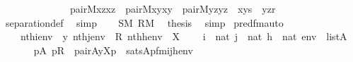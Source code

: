 \begin{isabellebody}
\ \ \ \ \ \ \ \ \ \ \ \ \ \ pair{\isacharparenleft}{\kern0pt}{\isacharhash}{\kern0pt}{\isacharhash}{\kern0pt}M{\isacharcomma}{\kern0pt}x{\isacharcomma}{\kern0pt}z{\isacharcomma}{\kern0pt}xz{\isacharparenright}{\kern0pt}\ {\isacharampersand}{\kern0pt}\ pair{\isacharparenleft}{\kern0pt}{\isacharhash}{\kern0pt}{\isacharhash}{\kern0pt}M{\isacharcomma}{\kern0pt}x{\isacharcomma}{\kern0pt}y{\isacharcomma}{\kern0pt}xy{\isacharparenright}{\kern0pt}\ {\isacharampersand}{\kern0pt}\ pair{\isacharparenleft}{\kern0pt}{\isacharhash}{\kern0pt}{\isacharhash}{\kern0pt}M{\isacharcomma}{\kern0pt}y{\isacharcomma}{\kern0pt}z{\isacharcomma}{\kern0pt}yz{\isacharparenright}{\kern0pt}\ {\isacharampersand}{\kern0pt}\ xy{\isasymin}s\ {\isacharampersand}{\kern0pt}\ yz{\isasymin}r{\isacharparenright}{\kern0pt}{\isachardoublequoteclose}\isanewline
\ \ \ \ \isamarkupfalse%
\ separation{\isacharunderscore}{\kern0pt}def\ \isamarkupfalse%
\ simp\isanewline
\ \ \isamarkupfalse%
\ {\isacartoucheopen}S{\isasymin}M{\isacartoucheclose}\ {\isacartoucheopen}R{\isasymin}M{\isacartoucheclose}\ \isamarkupfalse%
\ {\isacharquery}{\kern0pt}thesis\ \isamarkupfalse%
\ simp\isanewline
{}\isamarkupfalse%
%
\endisatagproof
{\isafoldproof}%
%
\isadelimproof
\isanewline
%
\endisadelimproof
\isanewline
\isanewline
{}\isamarkupfalse%
\ pred{\isacharunderscore}{\kern0pt}fm{\isacharunderscore}{\kern0pt}auto{\isacharcolon}{\kern0pt}\isanewline
\ \ \isanewline
\ \ \ \ {\isachardoublequoteopen}nth{\isacharparenleft}{\kern0pt}i{\isacharcomma}{\kern0pt}env{\isacharparenright}{\kern0pt}\ {\isacharequal}{\kern0pt}\ y{\isachardoublequoteclose}\ {\isachardoublequoteopen}nth{\isacharparenleft}{\kern0pt}j{\isacharcomma}{\kern0pt}env{\isacharparenright}{\kern0pt}\ {\isacharequal}{\kern0pt}\ R{\isachardoublequoteclose}\ {\isachardoublequoteopen}nth{\isacharparenleft}{\kern0pt}h{\isacharcomma}{\kern0pt}env{\isacharparenright}{\kern0pt}\ {\isacharequal}{\kern0pt}\ X{\isachardoublequoteclose}\isanewline
\ \ \ \ {\isachardoublequoteopen}i\ {\isasymin}\ nat{\isachardoublequoteclose}\ {\isachardoublequoteopen}j\ {\isasymin}\ nat{\isachardoublequoteclose}\ {\isachardoublequoteopen}h\ {\isasymin}\ nat{\isachardoublequoteclose}\ {\isachardoublequoteopen}env\ {\isasymin}\ list{\isacharparenleft}{\kern0pt}A{\isacharparenright}{\kern0pt}{\isachardoublequoteclose}\isanewline
\ \ \isanewline
\ \ \ \ {\isachardoublequoteopen}{\isacharparenleft}{\kern0pt}{\isasymexists}p{\isasymin}A{\isachardot}{\kern0pt}\ p{\isasymin}R\ {\isacharampersand}{\kern0pt}\ pair{\isacharparenleft}{\kern0pt}{\isacharhash}{\kern0pt}{\isacharhash}{\kern0pt}A{\isacharcomma}{\kern0pt}y{\isacharcomma}{\kern0pt}X{\isacharcomma}{\kern0pt}p{\isacharparenright}{\kern0pt}{\isacharparenright}{\kern0pt}\ {\isasymlongleftrightarrow}\ sats{\isacharparenleft}{\kern0pt}A{\isacharcomma}{\kern0pt}{\isacharquery}{\kern0pt}pfm{\isacharparenleft}{\kern0pt}i{\isacharcomma}{\kern0pt}j{\isacharcomma}{\kern0pt}h{\isacharparenright}{\kern0pt}{\isacharcomma}{\kern0pt}env{\isacharparenright}{\kern0pt}{\isachardoublequoteclose}\isanewline

\end{isabellebody}
